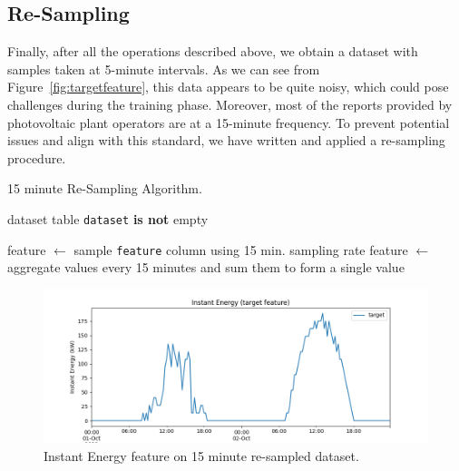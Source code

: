\subsection{Re-Sampling}
Finally, after all the operations described above, we obtain a dataset
with samples taken at 5-minute intervals. As we can see from
Figure~\ref{fig:targetfeature}, this data appears to be quite noisy,
which could pose
challenges during the training phase. Moreover, most of the reports
provided by photovoltaic plant operators are at a 15-minute frequency.
To prevent potential issues and align with this standard, we have
written and applied a re-sampling procedure.

%

\begin{algorithm}[H]
	\caption{15 minute Re-Sampling Algorithm.}\label{alg:resampling}
	\begin{algorithmic}
		\Require dataset table
		\Ensure \texttt{dataset} \textbf{is not} empty

		\State feature $\gets$ sample \texttt{feature} column using 15 min. sampling rate
		\Else
		\State feature $\gets$ aggregate values every 15 minutes and sum them to form a single value
		\EndIf
		\EndFor
	\end{algorithmic}
\end{algorithm}

\begin{figure}[H]
	\centering
	\includegraphics[width=\linewidth, keepaspectratio]{chapters/2_data_preprocessing/imgs/targetfeature15min.png}
	\caption{Instant Energy feature on 15 minute re-sampled dataset.}\label{fig:15min}
\end{figure}


